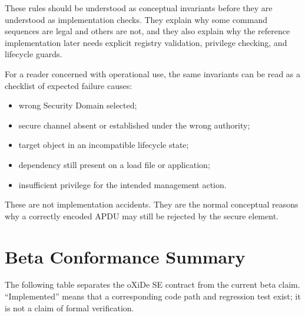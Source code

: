 These rules should be understood as conceptual invariants before they are
understood as implementation checks. They explain why some command
sequences are legal and others are not, and they also explain why the
reference implementation later needs explicit registry validation,
privilege checking, and lifecycle guards.

For a reader concerned with operational use, the same invariants can be
read as a checklist of expected failure causes:
\begin{itemize}
\item wrong Security Domain selected;
\item secure channel absent or established under the wrong authority;
\item target object in an incompatible lifecycle state;
\item dependency still present on a load file or application;
\item insufficient privilege for the intended management action.
\end{itemize}

These are not implementation accidents. They are the normal conceptual
reasons why a correctly encoded APDU may still be rejected by the secure
element.

\section{Beta Conformance Summary}

The following table separates the oXiDe SE contract from the current beta
claim. ``Implemented'' means that a corresponding code path and regression
test exist; it is not a claim of formal verification.

